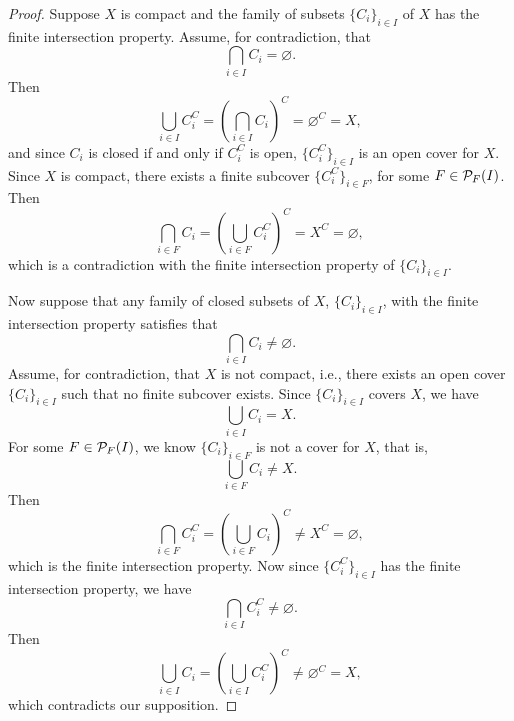 \documentclass[12pt]{article}
\let\emptyset\varnothing
\begin{document}
\begin{proof}
    Suppose $X$ is compact and the family of subsets $\{C_i\}_{i\in I}$ of $X$ has the finite intersection property. Assume, for contradiction, that
    \[\bigcap_{i\in I}C_i = \emptyset.\]
    Then
    \[\bigcup_{i\in I}C_i^C = \left(\bigcap_{i\in I}C_i\right)^C = \emptyset^C = X,\]
    and since $C_i$ is closed if and only if $C_i^C$ is open, $\{C_i^C\}_{i\in I}$ is an open cover for $X$. Since $X$ is compact, there exists a finite subcover $\{C_i^C\}_{i\in F}$, for some $F\in{\cal P}_{F}(I)$. Then
    \[\bigcap_{i\in F}C_i = \left(\bigcup_{i\in F}C_i^C\right)^C = X^C = \emptyset,\]
    which is a contradiction with the finite intersection property of $\{C_i\}_{i\in I}$.
    
    Now suppose that any family of closed subsets of $X$, $\{C_i\}_{i\in I}$, with the finite intersection property satisfies that
    \[\bigcap_{i \in I} C_i \ne \emptyset.\]
    Assume, for contradiction, that $X$ is not compact, i.e., there exists an open cover $\{C_i\}_{i\in I}$ such that no finite subcover exists. Since $\{C_i\}_{i\in I}$ covers $X$, we have
    \[\bigcup_{i\in I} C_i = X.\]
    For some $F\in{\cal P}_{F}(I)$, we know $\{C_i\}_{i\in F}$ is not a cover for $X$, that is,
    \[\bigcup_{i\in F} C_i \ne X.\]
    Then
    \[\bigcap_{i\in F} C_i^C = \left(\bigcup_{i\in F} C_i\right)^C \ne X^C = \emptyset,\]
    which is the finite intersection property. Now since $\{C_i^C\}_{i\in I}$ has the finite intersection property, we have
    \[\bigcap_{i\in I}C_i^C \ne \emptyset.\]
    Then
    \[\bigcup_{i\in I} C_i = \left(\bigcup_{i\in I} C_i^C\right)^C \ne \emptyset^C = X,\]
    which contradicts our supposition.

\end{proof}
\end{document}

